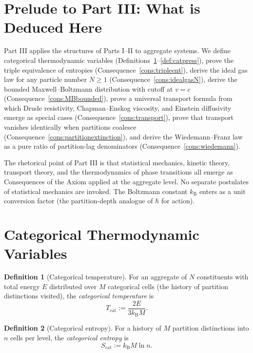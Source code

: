\documentclass[11pt,twocolumn,a4paper]{article}
\theoremstyle{axiomstyle}
\theoremstyle{conseqstyle}
\theoremstyle{definition}
\newtheorem{definition}{Definition}
\theoremstyle{remark}
\newcommand{\kB}{k_{\mathrm{B}}}
\newcommand{\St}{S_{\mathrm{cat}}}
\begin{document}
\section*{Prelude to Part III: What is Deduced Here}

Part III applies the structures of Parts I--II to aggregate systems. We define categorical thermodynamic variables (Definitions~\ref{def:cattemp}--\ref{def:catpress}), prove the triple equivalence of entropies (Consequence~\ref{cons:tripleent}), derive the ideal gas law for any particle number $N\ge 1$ (Consequence~\ref{cons:idealgasN}), derive the bounded Maxwell--Boltzmann distribution with cutoff at $v=c$ (Consequence~\ref{cons:MBbounded}), prove a universal transport formula from which Drude resistivity, Chapman--Enskog viscosity, and Einstein diffusivity emerge as special cases (Consequence~\ref{cons:transport}), prove that transport vanishes identically when partitions coalesce (Consequence~\ref{cons:partitionextinction}), and derive the Wiedemann--Franz law as a pure ratio of partition-lag denominators (Consequence~\ref{cons:wiedemann}).

The rhetorical point of Part III is that statistical mechanics, kinetic theory, transport theory, and the thermodynamics of phase transitions all emerge as Consequences of the Axiom applied at the aggregate level. No separate postulates of statistical mechanics are invoked. The Boltzmann constant $\kB$ enters as a unit conversion factor (the partition-depth analogue of $\hbar$ for action).

\section{Categorical Thermodynamic Variables}
\label{sec:catthermo}

\begin{definition}[Categorical temperature]
\label{def:cattemp}
For an aggregate of $N$ constituents with total energy $E$ distributed over $M$ categorical cells (the history of partition distinctions visited), the \emph{categorical temperature} is
\begin{equation}
T_{\mathrm{cat}}:=\frac{2E}{3\kB M}.
\label{eq:Tcat}
\end{equation}
\end{definition}

\begin{definition}[Categorical entropy]
\label{def:catent}
For a history of $M$ partition distinctions into $n$ cells per level, the \emph{categorical entropy} is
\begin{equation}
\St:=\kB M\ln n.
\label{eq:Scat}
\end{equation}
\end{definition}
\end{document}
